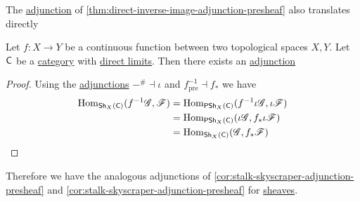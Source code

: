 \documentclass[../../../main]{subfiles}
\begin{document}
The \hyperref[def:adjoint-functors]{adjunction} of \autoref{thm:direct-inverse-image-adjunction-presheaf} also translates directly
\begin{theorem}
  Let \(f: X \to Y\) be a continuous function between two topological spaces \(X, Y\).
  Let \(\mathsf{C}\) be a \hyperref[def:category]{category} with \hyperref[def:direct-limit]{direct limits}.
  Then there exists an \hyperref[def:adjoint-functors]{adjunction}
  \begin{center}
  \end{center}
\end{theorem}
\begin{proof}
  Using the \hyperref[def:adjoint-functors]{adjunctions} \(-^{\#} \dashv \iota\) and \(f_{\operatorname{pre}}^{-1} \dashv f_{\ast}\) we have
  \begin{align*}
        \operatorname{Hom}_{\mathsf{Sh}_{X}(\mathsf{C})}(f^{-1} \mathscr{G}, \mathscr{F}) &= \operatorname{Hom}_{\mathsf{PSh}_{X}(\mathsf{C})}(f^{-1} \iota\mathscr{G}, \iota\mathscr{F})  \\
                                                                  &= \operatorname{Hom}_{\mathsf{PSh}_{X}(\mathsf{C})}(\iota\mathscr{G}, f_{\ast}\iota\mathscr{F}) \\
                                                                  &= \operatorname{Hom}_{\mathsf{Sh}_{X}(\mathsf{C})}(\mathscr{G}, f_{\ast}\mathscr{F})
  \end{align*}
\end{proof}

Therefore we have the analogous adjunctions of \autoref{cor:stalk-skyscraper-adjunction-presheaf} and \autoref{cor:stalk-skyscraper-adjunction-presheaf} for \hyperref[def:sheaf]{sheaves}.
\end{document}
